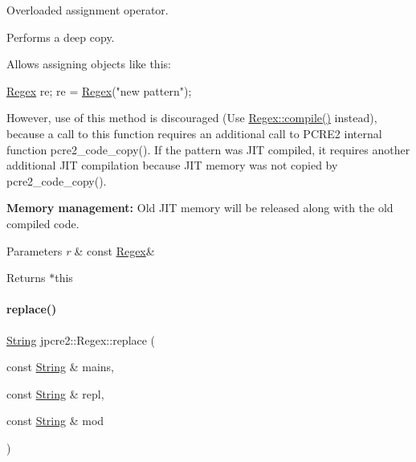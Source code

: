 Overloaded assignment operator. 

Performs a deep copy.

Allows assigning objects like this\+: 
\begin{DoxyCode}
\hyperlink{classjpcre2_1_1Regex_a302f65cd5747c5d34570ca76516ab715_a302f65cd5747c5d34570ca76516ab715}{Regex} re;
re = \hyperlink{classjpcre2_1_1Regex_a302f65cd5747c5d34570ca76516ab715_a302f65cd5747c5d34570ca76516ab715}{Regex}(\textcolor{stringliteral}{"new pattern"});
\end{DoxyCode}
 However, use of this method is discouraged (Use \hyperlink{classjpcre2_1_1Regex_aad1d5ef1e87f762f68a587eec4022e69_aad1d5ef1e87f762f68a587eec4022e69}{Regex\+::compile()} instead), because a call to this function requires an additional call to P\+C\+R\+E2 internal function pcre2\+\_\+code\+\_\+copy(). If the pattern was J\+IT compiled, it requires another additional J\+IT compilation because J\+IT memory was not copied by pcre2\+\_\+code\+\_\+copy().

{\bfseries Memory management\+:} Old J\+IT memory will be released along with the old compiled code. 
\begin{DoxyParams}{Parameters}
{\em r} & const \hyperlink{classjpcre2_1_1Regex}{Regex}\& \\
\hline
\end{DoxyParams}
\begin{DoxyReturn}{Returns}
$\ast$this 
\end{DoxyReturn}
\hypertarget{classjpcre2_1_1Regex_ac592ce7a5e4210ed5f90a0105b1f2981_ac592ce7a5e4210ed5f90a0105b1f2981}{}\label{classjpcre2_1_1Regex_ac592ce7a5e4210ed5f90a0105b1f2981_ac592ce7a5e4210ed5f90a0105b1f2981} 
\paragraph{\texorpdfstring{replace()}{replace()}\hspace{0.1cm}{\footnotesize\ttfamily [1/2]}}
{\footnotesize\ttfamily \hyperlink{namespacejpcre2_a91f03070152fb228bc116c5a737f1d16}{String} jpcre2\+::\+Regex\+::replace (\begin{DoxyParamCaption}\item[{const \hyperlink{namespacejpcre2_a91f03070152fb228bc116c5a737f1d16}{String} \&}]{mains,  }\item[{const \hyperlink{namespacejpcre2_a91f03070152fb228bc116c5a737f1d16}{String} \&}]{repl,  }\item[{const \hyperlink{namespacejpcre2_a91f03070152fb228bc116c5a737f1d16}{String} \&}]{mod }\end{DoxyParamCaption})\hspace{0.3cm}{\ttfamily [inline]}}



